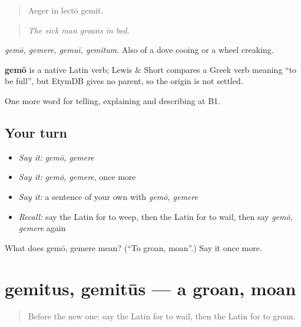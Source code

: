 \begin{quote}
Aeger in lectō gemit.
\end{quote}

\begin{quote}
\emph{The sick man groans in bed.}
\end{quote}

\emph{gemō, gemere, gemuī, gemitum}. Also of a dove cooing or a wheel creaking.

\begin{cousinweb}
\textbf{gemō} is a native Latin verb; Lewis \& Short compares a Greek verb meaning \textquotedblleft{}to be full\textquotedblright{}, but EtymDB gives no parent, so the origin is not settled.
\end{cousinweb}

\begin{grammarlens}[title={What you've built}]
One more word for telling, explaining and describing at B1.
\end{grammarlens}

\subsection*{Your turn}
\begin{itemize}
\raggedright
  \item \emph{Say it:} \emph{gemō, gemere}
  \item \emph{Say it:} \emph{gemō, gemere}, once more
  \item \emph{Say it:} a sentence of your own with \emph{gemō, gemere}
  \item \emph{Recall:} say the Latin for to weep, then the Latin for to wail, then say \emph{gemō, gemere} again
\end{itemize}

\begin{tcolorbox}[breakable,colback=teal!4,colframe=teal!35!black,title={Before you move on}]
What does gemō, gemere mean? (\textquotedblleft{}To groan, moan\textquotedblright{}.) Say it once more.
\end{tcolorbox}
\section[gemitus, gemitūs]{gemitus, gemitūs — a groan, moan}

\label{lesson:LA-C491-gemitus}



\begin{quote}
Before the new one: say the Latin for to wail, then the Latin for to groan.
\end{quote}

